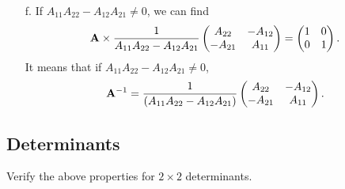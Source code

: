 \documentclass[a4paper]{book}
\newcommand{\A}{{\bf A}}
\begin{document}
\begin{solution}
\begin{enumerate}
	\item[f.] If $A_{11}A_{22}-A_{12}A_{21}\neq 0$, we can find
	\[
		\A \times \frac{1}{A_{11}A_{22}-A_{12}A_{21}}\begin{pmatrix} A_{22} & -A_{12} \\ -A_{21} & A_{11}	\end{pmatrix} = \begin{pmatrix} 1 & 0 \\ 0 & 1 \end{pmatrix}.
	\]
	It means that if $A_{11}A_{22}-A_{12}A_{21}\neq 0$,
	\begin{equation}
		\A^{-1} = \frac{1}{ ( A_{11} A_{22} - A_{12} A_{21} ) }\begin{pmatrix} A_{22} & -A_{12} \\ -A_{21} & A_{11}	\end{pmatrix}.
	\end{equation}
		
	\end{enumerate}
	\end{solution}
	
	\subsection{Determinants}
	
	\begin{exercise}
		Verify the above properties for $2 \times 2$ determinants.
	\end{exercise}
	
\end{document}
